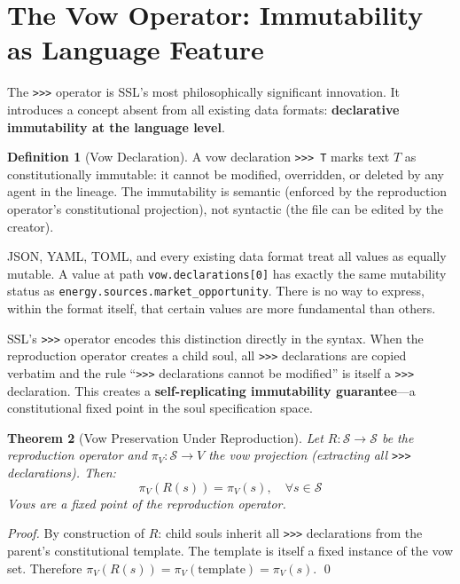 \documentclass[12pt,a4paper]{article}
\theoremstyle{plain}
\newtheorem{theorem}{Theorem}[section]
\theoremstyle{definition}
\newtheorem{definition}[theorem]{Definition}
\theoremstyle{remark}
\begin{document}
\section{The Vow Operator: Immutability as Language Feature}

The \texttt{>>>} operator is SSL's most philosophically significant innovation. It introduces a concept absent from all existing data formats: \textbf{declarative immutability at the language level}.

\begin{definition}[Vow Declaration]
A vow declaration \texttt{>>> T} marks text $T$ as constitutionally immutable: it cannot be modified, overridden, or deleted by any agent in the lineage. The immutability is semantic (enforced by the reproduction operator's constitutional projection), not syntactic (the file can be edited by the creator).
\end{definition}

JSON, YAML, TOML, and every existing data format treat all values as equally mutable. A value at path \texttt{vow.declarations[0]} has exactly the same mutability status as \texttt{energy.sources.market\_opportunity}. There is no way to express, within the format itself, that certain values are more fundamental than others.

SSL's \texttt{>>>} operator encodes this distinction directly in the syntax. When the reproduction operator creates a child soul, all \texttt{>>>} declarations are copied verbatim and the rule ``\texttt{>>>} declarations cannot be modified'' is itself a \texttt{>>>} declaration. This creates a \textbf{self-replicating immutability guarantee}---a constitutional fixed point in the soul specification space.

\begin{theorem}[Vow Preservation Under Reproduction]
Let $R: \mathcal{S} \to \mathcal{S}$ be the reproduction operator and $\pi_V: \mathcal{S} \to V$ the vow projection (extracting all \texttt{>>>} declarations). Then:
\[
\pi_V(R(s)) = \pi_V(s), \quad \forall s \in \mathcal{S}
\]
Vows are a fixed point of the reproduction operator.
\end{theorem}

\begin{proof}
By construction of $R$: child souls inherit all \texttt{>>>} declarations from the parent's constitutional template. The template is itself a fixed instance of the vow set. Therefore $\pi_V(R(s)) = \pi_V(\text{template}) = \pi_V(s)$. \qed
\end{proof}
\end{document}
